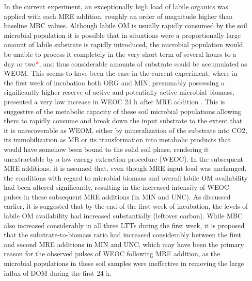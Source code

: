 \documentclass[12pt]{report}
\newcommand{\myRed}[1]{\textcolor{red}{#1}} %
\begin{document}
In the current experiment, an exceptionally high load of labile organics was applied with each MRE addition, roughly an order of magnitude higher than baseline MBC values.  Although labile OM is usually rapidly consumed by the soil microbial population it is possible that in situations were a proportionally large amount of labile substrate is rapidly introduced, the microbial population would be unable to process it completely in the very short term of several hours to a day or two\myRed{*}, and thus considerable amounts of substrate could be accumulated as WEOM. This seems to have been the case in the current experiment, where in the first week of incubation both ORG and MIN, presumably possessing a significantly higher reserve of active and potentially active microbial biomass, presented a very low increase in WEOC 24 h after MRE addition . This is suggestive of the metabolic capacity of these soil microbial populations allowing them to rapidly consume and break down the input substrate to the extent that it is unrecoverable as WEOM, either by mineralization of the substrate into CO2, its immobilization as MB or its transformation into metabolic products that would have somehow been bound to the solid soil phase, rendering it unextractable by a low energy extraction procedure (WEOC). In the subsequent MRE additions, it is assumed that, even though MRE input load was unchanged, the conditions with regard to microbial biomass and overall labile OM availability had been altered significantly, resulting in the increased intensity of WEOC pulses in these subsequent MRE additions (in MIN and UNC). As discussed earlier, it is suggested that by the end of the first week of incubation, the levels of labile OM availability had increased substantially (leftover carbon). While MBC also increased  considerably in all three LTTs during the first week, it is proposed that the substrate-to-biomass  ratio had increased considerably between the first and second MRE additions in MIN and UNC, which may have been the primary reason for the observed pulses of WEOC following MRE addition, as the microbial populations in these soil samples were ineffective in removing the large influx of DOM during the first 24 h. 
%
\end{document}
